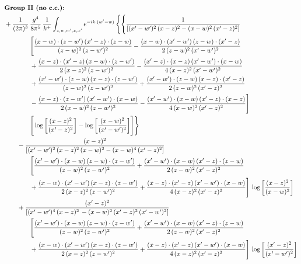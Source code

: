 \documentclass[10pt]{article}
\numberwithin{equation}{section}
\begin{document}
\begin{align}
&\textbf{Group II (no c.c.):}\notag\\
&+\frac{1}{(2\pi)^{3}}\,\frac{g^{4}}{8\pi^{5}}\,\frac{1}{k^{+}}\int_{z,w,w^{\prime},x,x^{\prime}}e^{-ik\cdot(w^{\prime}-w)}\,\Bigg\{\Bigg\{ \frac{1}{\left[(x^{\prime}-w^{\prime})^{2}\, (x-z)^{2}-(x-w)^{2}\, (x^{\prime}-z)^{2}\right]}\,\notag\\&\qquad\qquad  \Bigg[\frac{(x-w)\cdot (z-w^{\prime})\, (x^{\prime}-z)\cdot (z-w)}{(z-w)^{2}\,(z-w^{\prime})^{2}}-\frac{(x-w)\cdot (x^{\prime}-w^{\prime})\, (z-w)\cdot (x^{\prime}-z)}{2\, (z-w)^{2}\, (x^{\prime}-w^{\prime})^{2}}\notag\\&\qquad\qquad  + \frac{(x-z)\cdot (x^{\prime}-z)\, (x-w)\cdot (z-w^{\prime})}{2\, (x-z)^{2}\, (z-w^{\prime})^{2}}-\frac{(x^{\prime}-z)\cdot (x-z)\, (x^{\prime}-w^{\prime})\cdot (x-w)}{4\, (x-z)^{2}\, (x^{\prime}-w^{\prime})^{2}}\notag\\&\qquad\qquad  + \frac{(x^{\prime}-w^{\prime})\cdot (z-w)\, (x-z)\cdot (z-w^{\prime})}{(z-w)^{2}\,(z-w^{\prime})^{2}}+\frac{(x^{\prime}-w^{\prime})\cdot (z-w)\, (x-z)\cdot (x^{\prime}-z)}{2\, (z-w)^{2}\, (x^{\prime}-z)^{2}}\notag\\&\qquad\qquad  - \frac{(x-z)\cdot (z-w^{\prime})\, (x^{\prime}-w^{\prime})\cdot (x-w)}{2\, (x-w)^{2}\, (z-w^{\prime})^{2}} -\frac{(x^{\prime}-w^{\prime})\cdot (x-w)\, (x^{\prime}-z)\cdot (x-z)}{4\, (x-w)^{2}\, (x^{\prime}-z)^{2}}\Bigg]\notag\\&\qquad\qquad   \Bigg[\log{\left[\frac{(x-z)^{2}}{ (x^{\prime}-z)^{2}}\right]}-\log{\left[\frac{(x-w)^{2}}{(x^{\prime}-w^{\prime})^{2}}\right]}\Bigg]\Bigg\}\notag\\
&\qquad-\frac{(x-z)^{2}}{\left[(x^{\prime}-w^{\prime})^{2}\,(x-z)^{2}\,(x-w)^{2} - (x-w)^{4}\, (x^{\prime}-z)^{2}\right]}\,  \notag\\&\qquad\qquad  \Bigg[\frac{(x^{\prime}-w^{\prime})\cdot (x-w)\, (z-w)\cdot (z-w^{\prime})}{(z-w)^{2}\, (z-w^{\prime})^{2}}+\frac{(x^{\prime}-w^{\prime})\cdot (x-w)\, (x^{\prime}-z)\cdot (z-w)}{2\, (z-w)^{2}\, (x^{\prime}-z)^{2}}\notag\\&\qquad\qquad  +\frac{(x-w)\cdot (x^{\prime}-w^{\prime})\, (x-z)\cdot (z-w^{\prime})}{2\, (x-z)^{2}\, (z-w^{\prime})^{2}}+\frac{(x-z)\cdot (x^{\prime}-z)\, (x^{\prime}-w^{\prime})\cdot (x-w)}{4\, (x-z)^{2}\, (x^{\prime}-z)^{2}}\Bigg] \,\log{\left[\frac{(x-z)^{2}}{(x-w)^{2}}\right]}\notag\\
&\qquad+\frac{(x^{\prime}-z)^{2}}{\left[(x^{\prime}-w^{\prime})^{4}\,(x-z)^{2}\, - (x-w)^{2}\, (x^{\prime}-z)^{2}\,(x^{\prime}-w^{\prime})^{2}\right]}\,  \notag\\&\qquad\qquad  \Bigg[\frac{(x^{\prime}-w^{\prime})\cdot (x-w)\, (z-w)\cdot (z-w^{\prime})}{(z-w)^{2}\, (z-w^{\prime})^{2}}+\frac{(x^{\prime}-w^{\prime})\cdot (x-w)\, (x^{\prime}-z)\cdot (z-w)}{2\, (z-w)^{2}\, (x^{\prime}-z)^{2}}\notag\\&\qquad\qquad  +\frac{(x-w)\cdot (x^{\prime}-w^{\prime})\, (x-z)\cdot (z-w^{\prime})}{2\, (x-z)^{2}\, (z-w^{\prime})^{2}}+\frac{(x-z)\cdot (x^{\prime}-z)\, (x^{\prime}-w^{\prime})\cdot (x-w)}{4\, (x-z)^{2}\, (x^{\prime}-z)^{2}}\Bigg] \,\log{\left[\frac{(x^{\prime}-z)^{2}}{(x^{\prime}-w^{\prime})^{2}}\right]}\notag\\

\end{align}
\end{document}
